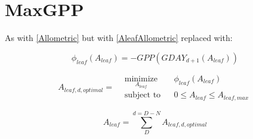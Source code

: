 \section{MaxGPP}
As with \ref{Allometric} but with \ref{AleafAllometric} replaced with:

\begin{equation}
	\phi_{leaf}(A_{leaf}) = - GPP (GDAY_{d+1}(A_{leaf}))
\end{equation}

\begin{equation*}
A_{leaf,d,optimal}=
\begin{aligned}
& \underset{A_{leaf}}{\text{minimize}}
& & \phi_{leaf}(A_{leaf}) \\
& \text{subject to}
& & 0 \leq A_{leaf} \leq A_{leaf,max}
\end{aligned}
\end{equation*}

\begin{equation}
	A_{leaf}= \sum_{D}^{d=D-N} A_{leaf,d,optimal}
\end{equation}
